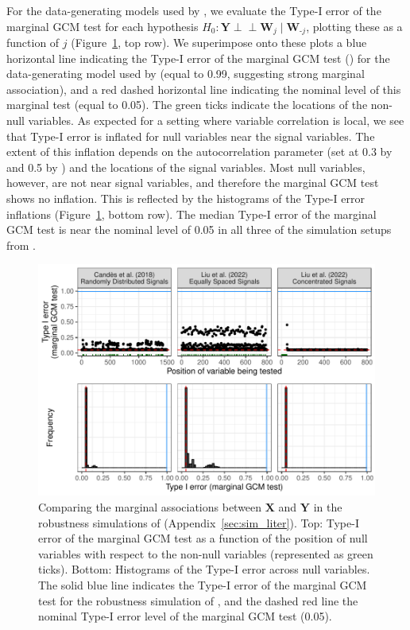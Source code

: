 \documentclass[aos]{imsart}
\theoremstyle{plain}
\theoremstyle{remark}
\newcommand{\independent}{{\perp \! \! \! \perp}}		%
\newcommand{\prx}{\bm X}								%
\newcommand{\pry}{{\bm Y}}								%
\newcommand{\nav}[1]{{\color{blue}{#1}}}
\begin{document}
For the data-generating models used by \citet{CetL16, Liu2022a}, we evaluate the Type-I error of the marginal GCM test for each hypothesis $H_0: \pry \independent \bm W_j \mid \bm W_{\text{-}j}$, plotting these as a function of $j$ (Figure~\ref{fig:evaluation_typeI_err}, top row). We superimpose onto these plots a blue horizontal line indicating the Type-I error of the marginal GCM test (\nav{fitting the intercept only model}) for the data-generating model used by \citet{Li2022} (equal to 0.99, suggesting strong marginal association), and a red dashed horizontal line indicating the nominal level of this marginal test (equal to 0.05). The green ticks indicate the locations of the non-null variables. As expected for a setting where variable correlation is local, we see that Type-I error is inflated for null variables near the signal variables. The extent of this inflation depends on the autocorrelation parameter (set at 0.3 by \cite{CetL16} and 0.5 by \cite{Liu2022a}) and the locations of the signal variables. Most null variables, however, are not near signal variables, and therefore the marginal GCM test shows no inflation. This is reflected by the histograms of the Type-I error inflations (Figure~\ref{fig:evaluation_typeI_err}, bottom row). The median Type-I error of the marginal GCM test is near the nominal level of 0.05 in all three of the simulation setups from \citet{CetL16, Liu2022a}.

\begin{figure}[!ht]
    \centering
    \includegraphics[width = \textwidth]{figures/type_I_Err_inflation_comparison.pdf}
    \caption{Comparing the marginal associations between $\prx$ and $\pry$ in the robustness simulations of \citet{CetL16, Liu2022a, Li2022} (Appendix~\ref{sec:sim_liter}). Top: Type-I error of the marginal GCM test as a function of the position of null variables with respect to the non-null variables (represented as green ticks). Bottom: Histograms of the Type-I error across null variables. The solid blue line indicates the Type-I error of the marginal GCM test for the robustness simulation of \citet{Li2022}, and the dashed red line the nominal Type-I error level of the marginal GCM test (0.05).}
    \label{fig:evaluation_typeI_err}
\end{figure}
\end{document}
